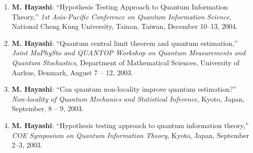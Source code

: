 \documentclass[a4paper,12pt,oneside]{article}
\begin{document}
\begin{enumerate}
\item
\textbf{M. Hayashi}: ``Hypothesis Testing Approach to Quantum Information Theory,'' 
{\em 1st Asia-Pacific Conference on Quantum Information Science}, 
National Cheng Kung University, Tainan, Taiwan,
December 10--13, 2004.


\item
\textbf{M. Hayashi}: ``Quantum central limit theorem and quantum estimation,'' 
{\em Joint MaPhySto and QUANTOP Workshop on Quantum Measurements and Quantum Stochastics}, 
Department of Mathematical Sciences, University of Aarhus, Denmark, August 7 -- 12, 2003.

\item
\textbf{M. Hayashi}: ``Can quantum non-locality improve quantum estimation?'' 
{\em Non-locality of Quantum Mechanics and Statistical Inference}, Kyoto, 
Japan, September, 8 -- 9, 2003.

\item
\textbf{M. Hayashi}: ``Hypothesis testing approach to quantum information theory,'' 
{\em COE Symposium on Quantum Information Theory}, Kyoto, Japan, September 2--3, 2003.

\end{enumerate}
\end{document}
